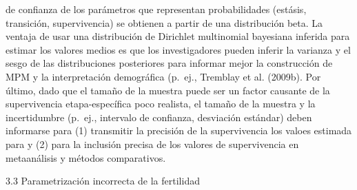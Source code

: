 \documentclass[
  12pt,
  letterpaper,
]{book}
\begin{document}
de confianza de los parámetros que representan probabilidades (estásis,
transición, supervivencia) se obtienen a partir de una distribución
beta. La ventaja de usar una distribución de Dirichlet multinomial
bayesiana inferida para estimar los valores medios es que los
investigadores pueden inferir la varianza y el sesgo de las
distribuciones posteriores para informar mejor la construcción de MPM y
la interpretación demográfica (p.~ej., Tremblay et al. (2009b). Por
último, dado que el tamaño de la muestra puede ser un factor causante de
la supervivencia etapa-específica poco realista, el tamaño de la muestra
y la incertidumbre (p.~ej., intervalo de confianza, desviación estándar)
deben informarse para (1) transmitir la precisión de la supervivencia
los valoes estimada para y (2) para la inclusión precisa de los valores
de supervivencia en metaanálisis y métodos comparativos.

3.3 \textbar{} Parametrización incorrecta de la fertilidad
\end{document}
